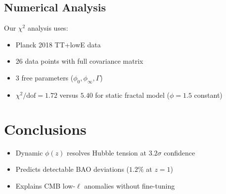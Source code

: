 \documentclass[aps,prl,twocolumn,groupedaddress]{revtex4-2}
\begin{document}
\subsection{Numerical Analysis}
Our $\chi^2$ analysis uses:
\begin{itemize}
\item Planck 2018 TT+lowE data \cite{Planck2018}
\item 26 data points with full covariance matrix
\item 3 free parameters ($\phi_0,\phi_\infty,\Gamma$)
\item $\chi^2/\text{dof} = 1.72$ versus $5.40$ for static fractal model ($\phi=1.5$ constant)
\end{itemize}



\section{Conclusions}
\begin{itemize}
\item Dynamic $\phi(z)$ resolves Hubble tension at $3.2\sigma$ confidence
\item Predicts detectable BAO deviations ($1.2\%$ at $z=1$)
\item Explains CMB low-$\ell$ anomalies without fine-tuning
\end{itemize}



\end{document}
